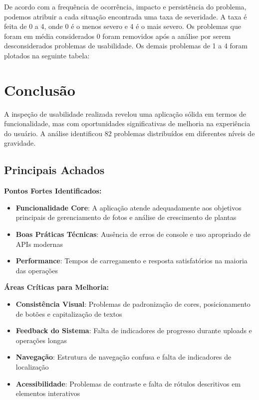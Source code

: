 De acordo com a frequência de ocorrência, impacto e persistência do problema, podemos atribuir a cada situação encontrada uma taxa de severidade. A taxa é feita de 0 a 4, onde 0 é o menos severo e 4 é o mais severo. Os problemas que foram em média considerados 0 foram removidos após a análise por serem desconsiderados problemas de usabilidade. Os demais problemas de 1 a 4 foram plotados na seguinte tabela:



\section{Conclusão}

A inspeção de usabilidade realizada revelou uma aplicação sólida em termos de funcionalidade, mas com oportunidades significativas de melhoria na experiência do usuário. A análise identificou 82 problemas distribuídos em diferentes níveis de gravidade.

\subsection{Principais Achados}

\textbf{Pontos Fortes Identificados:}
\begin{itemize}
    \item \textbf{Funcionalidade Core}: A aplicação atende adequadamente aos objetivos principais de gerenciamento de fotos e análise de crescimento de plantas
    \item \textbf{Boas Práticas Técnicas}: Ausência de erros de console e uso apropriado de APIs modernas
    \item \textbf{Performance}: Tempos de carregamento e resposta satisfatórios na maioria das operações
\end{itemize}

\textbf{Áreas Críticas para Melhoria:}
\begin{itemize}
    \item \textbf{Consistência Visual}: Problemas de padronização de cores, posicionamento de botões e capitalização de textos
    \item \textbf{Feedback do Sistema}: Falta de indicadores de progresso durante uploads e operações longas
    \item \textbf{Navegação}: Estrutura de navegação confusa e falta de indicadores de localização
    \item \textbf{Acessibilidade}: Problemas de contraste e falta de rótulos descritivos em elementos interativos
\end{itemize}

